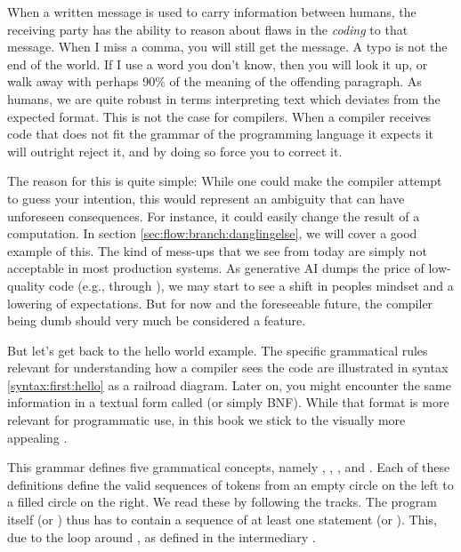 When a written  message is used to carry information between humans, the receiving party has the ability to reason about flaws in the \textsl{coding} to that message. When I miss a comma, you will still get the message. A typo is not the end of the world. If I use a word you don't know, then you will look it up, or walk away with perhaps 90\% of the meaning of the offending paragraph. As humans, we are quite robust in terms interpreting text which deviates from the expected format. This is not the case for compilers. When a compiler receives code that does not fit the grammar of the programming language it expects it will outright reject it, and by doing so force you to correct it.

The reason for this is quite simple: While one could make the compiler attempt to guess your intention, this would represent an ambiguity that can have unforeseen consequences. For instance, it could easily change the result of a computation. In section \ref{sec:flow:branch:danglingelse}, we will cover a good example of this. The kind of mess-ups that we see from  today are simply not acceptable in most production systems. As generative AI dumps the price of low-quality code (e.g., through ), we may start to see a shift in peoples mindset and a lowering of expectations. But for now and the foreseeable future, the compiler being dumb should very much be considered a feature.

But let's get back to the hello world example. The specific grammatical rules relevant for understanding how a compiler sees the code are illustrated in syntax \ref{syntax:first:hello} as a railroad diagram. Later on, you might encounter the same information in a textual form called  (or simply BNF). While that format is more relevant for programmatic use, in this book we stick to the visually more appealing .

\begin{syntaxfloat}
  
  \caption{Concepts involved in the basic hello-world program}
  \label{syntax:first:hello}
\end{syntaxfloat}

This grammar defines five grammatical concepts, namely , , ,  and . Each of these definitions define the valid sequences of tokens from an empty circle on the left to a filled circle on the right. We read these by following the tracks. The program itself (or ) thus has to contain a sequence of at least one statement (or ). This, due to the loop around , as defined in the intermediary .

